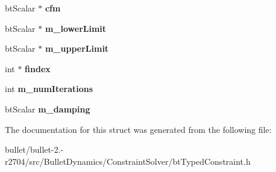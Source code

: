 \begin{DoxyCompactItemize}
\item 
\hypertarget{structbt_constraint_info2_aaa223d5bfd5b8e8a7a6f509600e16008}{bt\+Scalar $\ast$ {\bfseries cfm}}\label{structbt_constraint_info2_aaa223d5bfd5b8e8a7a6f509600e16008}

\item 
\hypertarget{structbt_constraint_info2_a3d963ff1fe6e3ca1e149c52e398adfd6}{bt\+Scalar $\ast$ {\bfseries m\+\_\+lower\+Limit}}\label{structbt_constraint_info2_a3d963ff1fe6e3ca1e149c52e398adfd6}

\item 
\hypertarget{structbt_constraint_info2_aa978f5cade80fe5d18ece312ead59ebd}{bt\+Scalar $\ast$ {\bfseries m\+\_\+upper\+Limit}}\label{structbt_constraint_info2_aa978f5cade80fe5d18ece312ead59ebd}

\item 
\hypertarget{structbt_constraint_info2_abc8ede81d1b13ebd04fbece2050a6d60}{int $\ast$ {\bfseries findex}}\label{structbt_constraint_info2_abc8ede81d1b13ebd04fbece2050a6d60}

\item 
\hypertarget{structbt_constraint_info2_a54c44c1c6815171c82f13022d5472680}{int {\bfseries m\+\_\+num\+Iterations}}\label{structbt_constraint_info2_a54c44c1c6815171c82f13022d5472680}

\item 
\hypertarget{structbt_constraint_info2_a652d5488a775f42d22e58923ff22d2b9}{bt\+Scalar {\bfseries m\+\_\+damping}}\label{structbt_constraint_info2_a652d5488a775f42d22e58923ff22d2b9}

\end{DoxyCompactItemize}


The documentation for this struct was generated from the following file\+:\begin{DoxyCompactItemize}
\item 
bullet/bullet-\/2.-\/r2704/src/\+Bullet\+Dynamics/\+Constraint\+Solver/bt\+Typed\+Constraint.\+h\end{DoxyCompactItemize}
